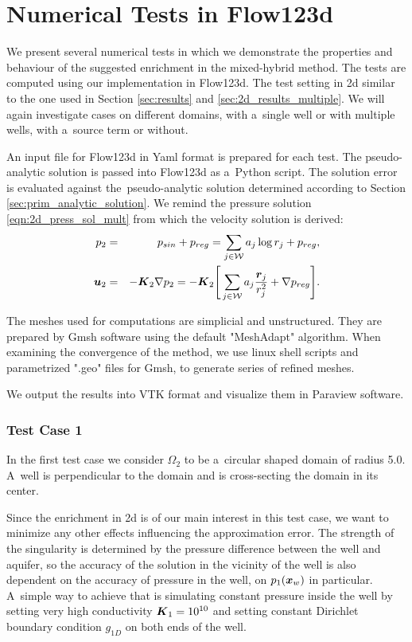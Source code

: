 \section{Numerical Tests in Flow123d}
We present several numerical tests in which we demonstrate the properties and behaviour of the suggested enrichment in the mixed-hybrid method.
The tests are computed using our implementation in Flow123d.
The test setting in 2d similar to the one used in Section \ref{sec:results} and \ref{sec:2d_results_multiple}.
We will again investigate cases on different domains, with a~single well or with multiple wells, with a~source term or without.

An input file for Flow123d in Yaml format is prepared for each test.
The pseudo-analytic solution is passed into Flow123d as a~Python script.
The solution error is evaluated against the~pseudo-analytic solution determined according
to Section \ref{sec:prim_analytic_solution}. We remind the pressure solution \eqref{eqn:2d_press_sol_mult} from which the velocity solution is derived:
\begin{eqnarray}
p_2 &=& p_{sin} + p_{reg} = \sum\limits_{j\in\mathcal{W}} a_j\log r_j + p_{reg}, \label{eqn:2d_press_solution}\\
\mathbf{\boldsymbol{u}}_2 &=& -\mathbf{\boldsymbol{K}}_2 \nabla p_2 = - \mathbf{\boldsymbol{K}}_2 \Bigg[ \sum\limits_{j\in\mathcal{W}} a_j\frac{\mathbf{\boldsymbol{r}}_j}{r_j^2} + \nabla p_{reg} \Bigg].  \label{eqn:2d_vel_solution}
\end{eqnarray}

The meshes used for computations are simplicial and unstructured.
They are prepared by Gmsh software using the default "MeshAdapt" algorithm.
When examining the convergence of the method, we use linux shell scripts and parametrized ".geo" files for Gmsh,
to generate series of refined meshes.

We output the results into VTK format and visualize them in Paraview software. 

\subsubsection{Test Case 1}
In the first test case we consider $\Omega_2$ to be a~circular shaped domain of radius 5.0.
A~well is perpendicular to the domain and is cross-secting the domain in its center.

Since the enrichment in 2d is of our main interest in this test case, we want to minimize any other effects
influencing the approximation error. The strength of the singularity is determined by the pressure difference
between the well and aquifer, so the accuracy of the solution in the vicinity of the well is also dependent
on the accuracy of pressure in the well, on $p_1(\mathbf{\boldsymbol{x}}_w)$ in particular.
A~simple way to achieve that is simulating constant pressure inside the well by setting very high conductivity $\mathbf{\boldsymbol{K}}_1=10^{10}$
and setting constant Dirichlet boundary condition $g_{1D}$ on both ends of the well.

